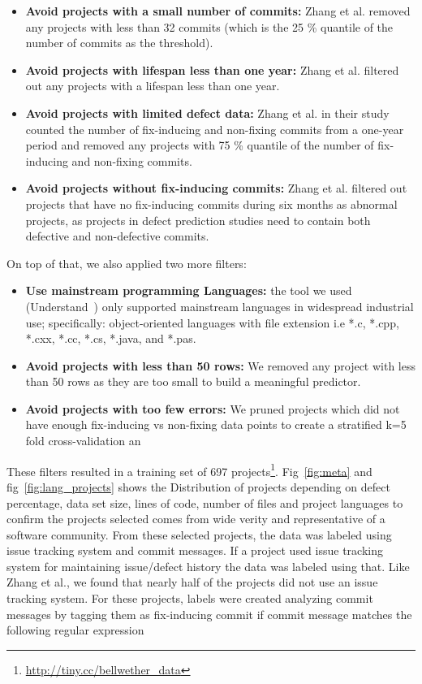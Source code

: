 \documentclass[10pt,journal,compsoc]{IEEEtran}
\newcommand{\bi}{\begin{itemize}}
\newcommand{\ei}{\end{itemize}}
\begin{document}
\bi
  \item \textbf{Avoid projects with a small number of commits:} Zhang et al. removed any projects with less than 32 commits (which is the 25 \% quantile of the number of commits as the threshold). 
 
    
    \item \textbf{Avoid projects with lifespan less than one year:} Zhang et al. filtered out any  projects with a lifespan less than one year.  
    
    \item \textbf{Avoid projects with limited defect data:} Zhang et al. in their study counted the number of fix-inducing and non-fixing commits from a one-year period and removed any projects with 75 \% quantile of the number of fix-inducing and non-fixing commits.  
    
    \item \textbf{Avoid projects without fix-inducing commits:} Zhang et al. filtered out projects that have no fix-inducing commits during six months as abnormal projects, as projects in defect prediction studies need to contain both defective and non-defective commits.
\ei
On top of that, we also applied two more filters:
\bi
    \item \textbf{Use mainstream programming Languages:} the tool
    we used (Understand~\cite{visualize}) only supported     mainstream languages in widespread
    industrial use; specifically: object-oriented languages with file extension i.e *.c, *.cpp, *.cxx, *.cc, *.cs, *.java, and *.pas.
    
    \item \textbf{Avoid projects with less than 50 rows:} We removed any project with less than 50 rows as they are too small to build a meaningful predictor. 
       \item \textbf{Avoid projects with too few errors:}
    We pruned  projects which did not  have enough fix-inducing vs non-fixing data points to create a stratified k=5 fold cross-validation an 
    
\ei
These filters resulted in a training set of   697 projects\footnote{\href{http://tiny.cc/bellwether_data}{http://tiny.cc/bellwether\_data}}. Fig~\ref{fig:meta} and fig~\ref{fig:lang_projects} shows the Distribution of projects depending on defect percentage, data set size, lines of code, number of files and project languages to confirm the projects selected comes from wide verity and representative of a software community. 
From these selected projects, the data was labeled using issue tracking system and commit messages. If a project used issue tracking system for maintaining issue/defect history the data was labeled using that. Like  Zhang et al., we found that nearly half  of the projects did not use an issue tracking system. For these projects, labels were created analyzing commit messages by tagging them as fix-inducing commit if commit message matches the following regular expression
\end{document}
